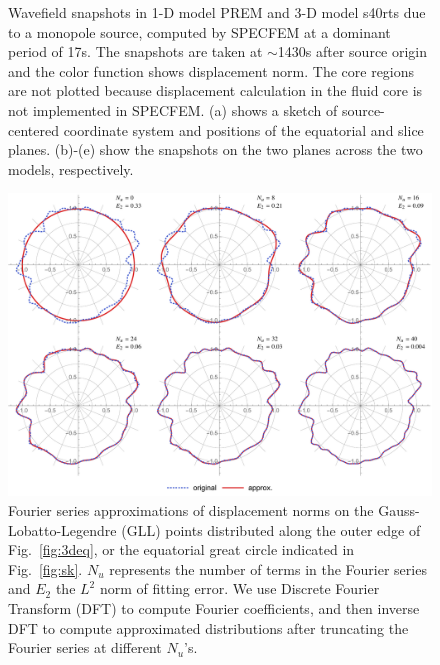 \documentclass[extra,referee]{gji}
\begin{document}
\begin{figure}
\begin{minipage}{0.6\textwidth}
\begin{minipage}{.39\textwidth}
      \label{fig:3dsl}    
    \end{minipage}
  \end{minipage}%
  \caption{Wavefield snapshots in 1-D model 
  PREM and 3-D model s40rts due to a monopole source, 
  computed by SPECFEM at a dominant period of 17s. 
  The snapshots are taken at $\sim$1430s after source origin 
  and the color function shows displacement norm. 
  The core regions are not plotted because displacement calculation
  in the fluid core is not implemented in SPECFEM. 
  (a) shows a sketch of source-centered coordinate system and 
  positions of the equatorial and slice planes. 
  (b)-(e) show the snapshots on the two planes across the two models, respectively.}
  \label{fig:snapshot}
\end{figure}

\begin{figure}
  \centering
  \includegraphics[width=\textwidth]{fig/equator/fourier.pdf}
  \caption{Fourier series approximations of displacement norms 
  on the Gauss-Lobatto-Legendre (GLL) points distributed along the outer edge of Fig.~\ref{fig:3deq},
  or the equatorial great circle indicated in Fig.~\ref{fig:sk}. 
  $N_u$ represents the number of terms in the Fourier series 
  and $E_2$ the $L^2$ norm of fitting error. We use  
  Discrete Fourier Transform (DFT) to compute Fourier coefficients, 
  and then inverse DFT to compute approximated distributions 
  after truncating the Fourier series at different $N_u$'s.} 
  \label{fig:four}
\end{figure}
\end{document}
